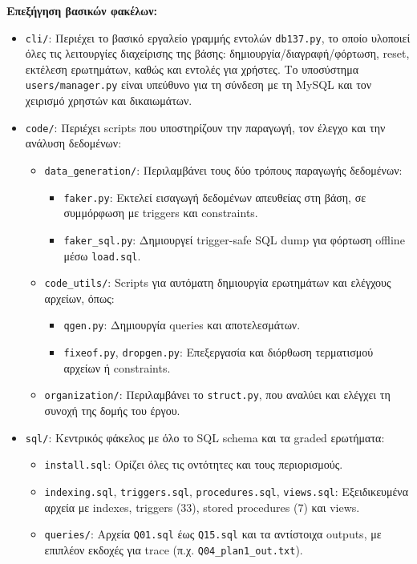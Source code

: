 \documentclass[13pt]{extarticle}
\begin{document}
\noindent\textbf{Επεξήγηση βασικών φακέλων:}
\begin{itemize}
  \item \texttt{cli/}: Περιέχει το βασικό εργαλείο γραμμής εντολών \texttt{db137.py}, το οποίο υλοποιεί όλες τις λειτουργίες διαχείρισης της βάσης: δημιουργία/διαγραφή/φόρτωση, reset, εκτέλεση ερωτημάτων, καθώς και εντολές για χρήστες. Το υποσύστημα \texttt{users/manager.py} είναι υπεύθυνο για τη σύνδεση με τη MySQL και τον χειρισμό χρηστών και δικαιωμάτων.

  \item \texttt{code/}: Περιέχει scripts που υποστηρίζουν την παραγωγή, τον έλεγχο και την ανάλυση δεδομένων:
  \begin{itemize}
    \item \texttt{data\_generation/}: Περιλαμβάνει τους δύο τρόπους παραγωγής δεδομένων:
    \begin{itemize}
      \item \texttt{faker.py}: Εκτελεί εισαγωγή δεδομένων απευθείας στη βάση, σε συμμόρφωση με triggers και constraints.
      \item \texttt{faker\_sql.py}: Δημιουργεί trigger-safe SQL dump για φόρτωση offline μέσω \texttt{load.sql}.
    \end{itemize}
    \item \texttt{code\_utils/}: Scripts για αυτόματη δημιουργία ερωτημάτων και ελέγχους αρχείων, όπως:
    \begin{itemize}
      \item \texttt{qgen.py}: Δημιουργία queries και αποτελεσμάτων.
      \item \texttt{fixeof.py}, \texttt{dropgen.py}: Επεξεργασία και διόρθωση τερματισμού αρχείων ή constraints.
    \end{itemize}
    \item \texttt{organization/}: Περιλαμβάνει το \texttt{struct.py}, που αναλύει και ελέγχει τη συνοχή της δομής του έργου.
  \end{itemize}

  \item \texttt{sql/}: Κεντρικός φάκελος με όλο το SQL schema και τα graded ερωτήματα:
  \begin{itemize}
    \item \texttt{install.sql}: Ορίζει όλες τις οντότητες και τους περιορισμούς.
    \item \texttt{indexing.sql}, \texttt{triggers.sql}, \texttt{procedures.sql}, \texttt{views.sql}: Εξειδικευμένα αρχεία με indexes, triggers (33), stored procedures (7) και views.
    \item \texttt{queries/}: Αρχεία \texttt{Q01.sql} έως \texttt{Q15.sql} και τα αντίστοιχα outputs, με επιπλέον εκδοχές για trace (π.χ. \texttt{Q04\_plan1\_out.txt}).
  \end{itemize}


\end{itemize}
\end{document}
